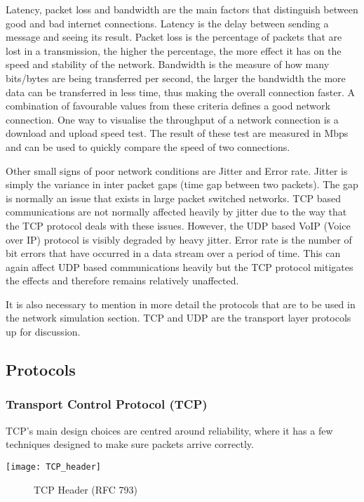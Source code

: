 Latency, packet loss and bandwidth are the main factors that distinguish between good and bad internet connections. Latency is the delay between sending a message and seeing its result. Packet loss is the percentage of packets that are lost in a transmission, the higher the percentage, the more effect it has on the speed and stability of the network. Bandwidth is the measure of how many bits/bytes are being transferred per second, the larger the bandwidth the more data can be transferred in less time, thus making the overall connection faster. A combination of favourable values from these criteria defines a good network connection. One way to visualise the throughput of a network connection is a download and upload speed test. The result of these test are measured in Mbps and can be used to quickly compare the speed of two connections.

Other small signs of poor network conditions are Jitter and Error rate. Jitter is simply the variance in inter packet gaps (time gap between two packets). The gap is normally an issue that exists in large packet switched networks. TCP based communications are not normally affected heavily by jitter due to the way that the TCP protocol deals with these issues. However, the UDP based VoIP (Voice over IP) protocol is visibly degraded by heavy jitter. Error rate is the number of bit errors that have occurred in a data stream over a period of time. This can again affect UDP based communications heavily but the TCP protocol mitigates the effects and therefore remains relatively unaffected.

It is also necessary to mention in more detail the protocols that are to be used in the network simulation section. TCP \citep{TCP} and UDP \citep{UDP} are the transport layer protocols up for discussion. 

\clearpage
\subsection{Protocols}
\subsubsection{Transport Control Protocol (TCP)}
TCP's main design choices are centred around reliability, where it has a few techniques designed to make sure packets arrive correctly. 


\begin{center}
	\texttt{[image: TCP\_header]}
	\begin{figure}[h]
		\caption{TCP Header (RFC 793)}
	\end{figure}	
\end{center}

